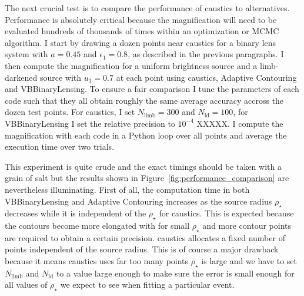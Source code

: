 \documentclass[12pt,dvipsnames]{report}
\newcommand{\ssf}[1]{\textsf{#1}}
\begin{document}
The next crucial test is to compare the performance of \ssf{caustics} to alternatives.
Performance is absolutely critical because the magnification will need to be evaluated hundreds 
of thousands of times within an optimization or MCMC algorithm. I start by drawing a dozen 
points near caustics for a binary lens system with $a=0.45$ and $\epsilon_1=0.8$,
as described in the previous paragraphs. I then compute the magnification for 
a uniform brightness source and a limb-darkened source with $u_1=0.7$ at each point using 
\ssf{caustics}, \ssf{Adaptive Contouring} \citep{2007MNRAS.377.1679D} and 
\ssf{VBBinaryLensing}. To ensure a fair comparison I tune the parameters of each code 
such that they all obtain roughly the same average accuracy accross the dozen test points. For  
\ssf{caustics}, I set $N_\mathrm{limb}=300$ and $N_\mathrm{ld}=100$, for \ssf{VBBinaryLensing}
I set the relative precision to $10^{-4}$  XXXXX.
I compute the magnification with each code in a \ssf{Python} loop over all points and average 
the execution time over two trials. 

This experiment is quite crude and the exact timings should be taken with a grain of salt 
but the results shown in Figure~\ref{fig:performance_comparison} are nevertheless 
illuminating. First of all, the computation time in both \ssf{VBBinaryLensing} and 
\ssf{Adaptive Contouring} increases  as the source radius $\rho_\star$ decreases while 
it is independent of the $\rho_\star$ for \ssf{caustics}. This is expected because the 
contours become more elongated with for small $\rho_\star$ and more contour points are 
required to obtain a certain precision. \ssf{caustics} allocates a fixed number of points
independent of the source radius. This is of course a major 
drawback because it means \ssf{caustics} uses far too many points $\rho_\star$ is large and 
we have to set $N_\mathrm{limb}$ and $N_\mathrm{ld}$ to a value large enough to make sure 
the error is small enough for all values of $\rho_\star$ we expect to see when fitting 
a particular event.
\end{document}
